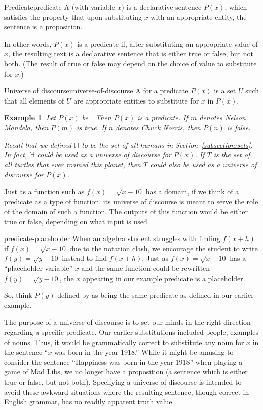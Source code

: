 \documentclass{book}
\newcounter{ekcounter}%
\theoremstyle{ekimcustom}
\newtheorem{example}[ekcounter]{Example}
\newcommand\defn[1]{{\color{blue}{\bf #1}}}
\begin{document}
\begin{bdefinition}{Predicate}{predicate}
A \defn{predicate} (with variable $x$) is a declarative sentence $P(x)$, which satisfies the property that upon substituting $x$ with an appropriate entity, the sentence is a proposition. 
\end{bdefinition}
In other words, $P(x)$ is a predicate if, after substituting an appropriate value of $x$, the resulting text is a declarative sentence that is either true or false, but not both. (The result of true or false may depend on the choice of value to substitute for $x$.)
\begin{bdefinition}{Universe of discourse}{universe-of-discourse}
A \defn{universe of discourse} for a predicate $P(x)$ is a set $U$ such that all elements of $U$ are appropriate entities to substitute for $x$ in $P(x)$.
\end{bdefinition}
\begin{example}
Let $P(x)$ be . Then $P(x)$ is a predicate. If $m$ denotes Nelson Mandela, then $P(m)$ is true. If $n$ denotes Chuck Norris, then $P(n)$ is false.

Recall that we defined $\mathbb{H}$ to be the set of all humans in Section~\ref{subsection:sets}. In fact, $\mathbb{H}$ could be used as a universe of discourse for $P(x)$. If $T$ is the set of all turtles that ever roamed this planet, then $T$ could also be used as a universe of discourse for $P(x)$.
\end{example}
Just as a function such as $f(x) = \sqrt{x-10}$ has a domain, if we think of a predicate as a type of function, its universe of discourse is meant to serve the role of the domain of such a function. The outputs of this function would be either true or false, depending on what input is used.
\begin{bremark}{}{predicate-placeholder}
When an algebra student struggles with finding $f(x+h)$ if $f(x)=\sqrt{x-10}$ due to the notation clash, we encourage the student to write $f(y)=\sqrt{y-10}$ instead to find $f(x+h)$. Just as $f(x)=\sqrt{x-10}$ has a ``placeholder variable'' $x$ and the same function could be rewritten $f(y)=\sqrt{y-10}$, the $x$ appearing in our example predicate is a placeholder.

So, think $P(y)$ defined by  as being the same predicate as defined in our earlier example.
\end{bremark}
The purpose of a universe of discourse is to set our minds in the right direction regarding a specific predicate. Our earlier substitutions included people, examples of nouns. Thus, it would be grammatically correct to substitute any noun for $x$ in the sentence ``$x$ was born in the year 1918.'' While it might be amusing to consider the sentence ``Happiness was born in the year 1918'' when playing a game of Mad Libs, we no longer have a proposition (a sentence which is either true or false, but not both). Specifying a universe of discourse is intended to avoid these awkward situations where the resulting sentence, though correct in English grammar, has no readily apparent truth value.
\end{document}
